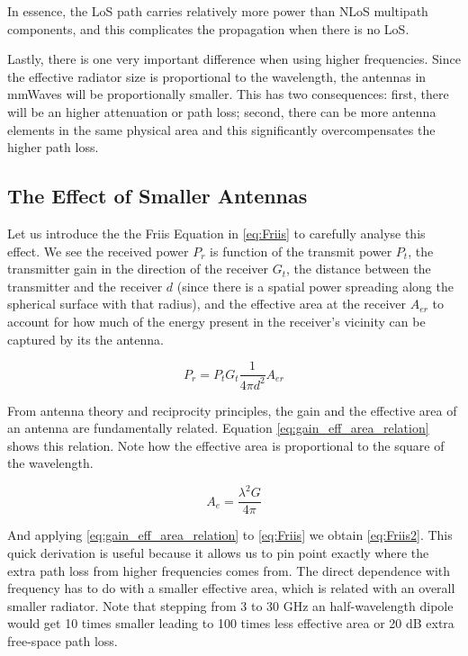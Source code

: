 

In essence, the \ac{LoS} path carries relatively more power than \ac{NLoS} multipath components, and this complicates the propagation when there is no \ac{LoS}.

Lastly, there is one very important difference when using higher frequencies. Since the effective radiator size is proportional to the wavelength, the antennas in mmWaves will be proportionally smaller. This has two consequences: first, there will be an higher attenuation or path loss; second, there can be more antenna elements in the same physical area and this significantly overcompensates the higher path loss.



\subsection*{The Effect of Smaller Antennas}

Let us introduce the the Friis Equation in \eqref{eq:Friis} to carefully analyse this effect. We see the received power $P_r$ is function of the transmit power $P_t$, the transmitter gain in the direction of the receiver $G_t$, the distance between the transmitter and the receiver $d$ (since there is a spatial power spreading along the spherical surface with that radius), and the effective area at the receiver $A_{er}$ to account for how much of the energy present in the receiver's vicinity can be captured by its the antenna.

\begin{equation} \label{eq:Friis}
    P_r = P_t G_t \frac{1}{4\pi d^2} A_{er}
\end{equation}

From antenna theory and reciprocity principles, the gain and the effective area of an antenna are fundamentally related. Equation \eqref{eq:gain_eff_area_relation} shows this relation. Note how the effective area is proportional to the square of the wavelength. 

\begin{equation} \label{eq:gain_eff_area_relation}
    A_e = \frac{\lambda^2 G}{4 \pi}
\end{equation}

And applying \eqref{eq:gain_eff_area_relation} to \eqref{eq:Friis} we obtain \eqref{eq:Friis2}. This quick derivation is useful because it allows us to pin point exactly where the extra path loss from higher frequencies comes from. The direct dependence with frequency has to do with a smaller effective area, which is related with an overall smaller radiator. Note that stepping from 3 to 30 GHz an half-wavelength dipole would get 10 times smaller leading to 100 times less effective area or 20 dB extra free-space path loss.

